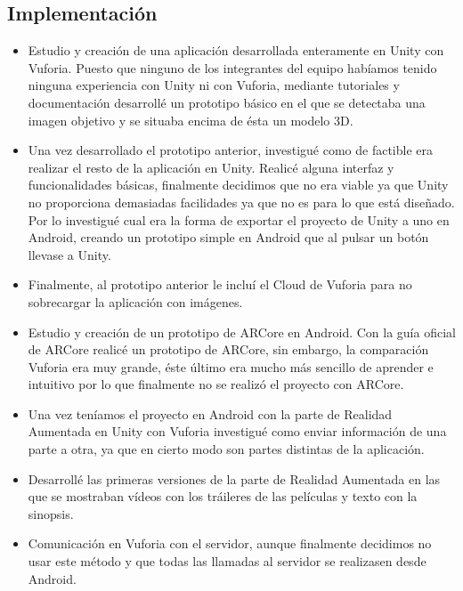             \subsection{Implementación}
            \label{makereference7.3.3}
                \begin{itemize}  
                    \item Estudio y creación de una aplicación desarrollada enteramente en Unity con Vuforia. Puesto que ninguno de los integrantes 
                    del equipo habíamos tenido ninguna experiencia con Unity ni con Vuforia, mediante tutoriales y documentación desarrollé un prototipo 
                    básico en el que se detectaba una imagen objetivo y se situaba encima de ésta un modelo 3D.
                    \item Una vez desarrollado el prototipo anterior, investigué como de factible era realizar el resto de la aplicación en Unity. Realicé 
                    alguna interfaz y funcionalidades básicas, finalmente decidimos que no era viable ya que Unity no proporciona demasiadas facilidades ya 
                    que no es para lo que está diseñado. Por lo investigué cual era la forma de exportar el proyecto de Unity a uno en Android, creando un 
                    prototipo simple en Android que al pulsar un botón llevase a Unity.
                    \item Finalmente, al prototipo anterior le incluí el Cloud de Vuforia para no sobrecargar la aplicación con imágenes.
                    \item Estudio y creación de un prototipo de ARCore en Android. Con la guía oficial de ARCore realicé un prototipo de ARCore, sin embargo, 
                    la comparación Vuforia era muy grande, éste último era mucho más sencillo de aprender e intuitivo por lo que finalmente no se realizó el proyecto con ARCore.
                    \item Una vez teníamos el proyecto en Android con la parte de Realidad Aumentada en Unity con Vuforia investigué como enviar información 
                    de una parte a otra, ya que en cierto modo son partes distintas de la aplicación.
                    \item Desarrollé las primeras versiones de la parte de Realidad Aumentada en las que se mostraban vídeos con los tráileres de las películas y texto con la sinopsis.
                    \item Comunicación en Vuforia con el servidor, aunque finalmente decidimos no usar este método y que todas las llamadas al servidor se realizasen desde Android.

\end{itemize}
